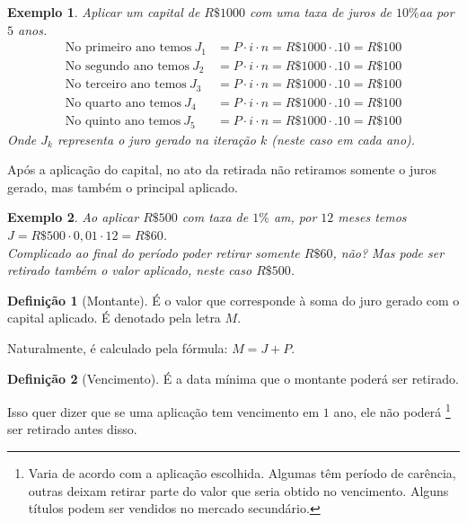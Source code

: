 \documentclass{book}
\theoremstyle{definition}
\newtheorem{definition}{Definição}
\theoremstyle{remark}
\theoremstyle{plain}
\theoremstyle{plain}
\theoremstyle{plain}
\theoremstyle{plain}
\newtheorem{example}{Exemplo}
\begin{document}
    \begin{example}
        Aplicar um capital de $R\$ \num{1000}$ com uma taxa de juros de $10\%$aa por $5$ anos.
        \begin{align*}
            \text{No primeiro ano temos}\ J_1 &= P \cdot i \cdot n = R\$ \num{1000} \cdot \num{.10} = R\$ 100 \\
            \text{No segundo ano temos}\ J_2 &= P \cdot i \cdot n = R\$ \num{1000} \cdot \num{.10} = R\$ 100 \\
            \text{No terceiro ano temos}\ J_3 &= P \cdot i \cdot n = R\$ \num{1000} \cdot \num{.10} = R\$ 100 \\
            \text{No quarto ano temos}\ J_4 &= P \cdot i \cdot n = R\$ \num{1000} \cdot \num{.10} = R\$ 100 \\
            \text{No quinto ano temos}\ J_5 &= P \cdot i \cdot n = R\$ \num{1000} \cdot \num{.10} = R\$ 100
        \end{align*}
        Onde $J_k$ representa o juro gerado na iteração $k$ (neste caso em cada ano).
    \end{example}

    Após a aplicação do capital, no ato da retirada não retiramos
    somente o juros gerado, mas também o principal aplicado.
    \begin{example}
        Ao aplicar $R\$ 500$ com taxa de $1\%$ am, por $12$ meses temos $J = R\$ 500 \cdot 0,01 \cdot 12 = R\$ 60 $. \\
        Complicado ao final do período poder retirar somente $R\$ 60$, não? Mas pode ser 
        retirado também o valor aplicado, neste caso $R\$ 500$.
    \end{example}
    \begin{definition}[Montante]
        É o valor que corresponde à soma do juro gerado com o capital aplicado.
        É denotado pela letra $M$.
    \end{definition}
        Naturalmente, é calculado pela fórmula: $M = J + P$.
    \begin{definition}[Vencimento]
        É a data mínima que o montante poderá ser retirado.
    \end{definition}
    Isso quer dizer que se uma aplicação tem vencimento em $1$ ano, ele não poderá \footnote{Varia de acordo 
    com a aplicação escolhida. Algumas têm período de carência, outras deixam retirar 
    parte do valor que seria obtido no vencimento. Alguns títulos podem ser vendidos no mercado secundário.
    } ser retirado antes disso.
        
\end{document}
